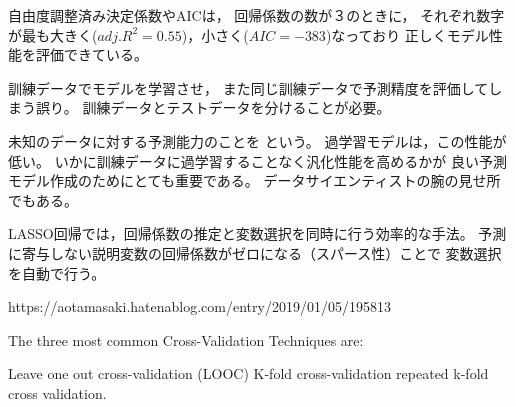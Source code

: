 {
  自由度調整済み決定係数やAICは，
  回帰係数の数が３のときに，
  それぞれ数字が最も大きく($adj.R^2=0.55$)，小さく($AIC=-383$)なっており
  正しくモデル性能を評価できている。
}

{
  訓練データでモデルを学習させ，
  また同じ訓練データで予測精度を評価してしまう誤り。
  \ra 訓練データとテストデータを分けることが必要。
}

{
  {
    未知のデータに対する予測能力のことを
    という。
    過学習モデルは，この性能が低い。
    いかに訓練データに過学習することなく汎化性能を高めるかが
    良い予測モデル作成のためにとても重要である。
    データサイエンティストの腕の見せ所でもある。
  }
}

{
  LASSO回帰では，回帰係数の推定と変数選択を同時に行う効率的な手法。 
  予測に寄与しない説明変数の回帰係数がゼロになる（スパース性）ことで
  変数選択を自動で行う。
}

{

  {https://aotamasaki.hatenablog.com/entry/2019/01/05/195813}
}

{

}

{

}

\MyFrame{}
{

The three most common Cross-Validation Techniques are:

    Leave one out cross-validation (LOOC)
    K-fold cross-validation
    repeated k-fold cross validation.
}





